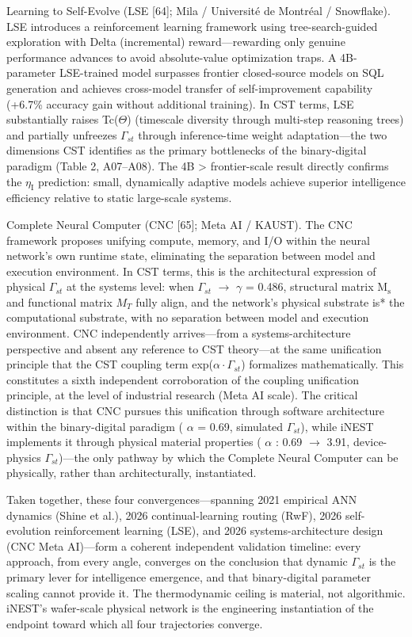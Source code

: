 \documentclass[a4paper,12pt]{article}
\providecommand{\textsubscript}[1]{\ensuremath{_{\text{#1}}}}
\begin{document}
Learning to Self-Evolve (LSE [64]; Mila / Universit\'e de Montr\'eal / Snowflake).
LSE introduces a reinforcement learning framework using tree-search-guided exploration with Delta (incremental) reward---rewarding only genuine performance advances to avoid absolute-value optimization traps.
A 4B-parameter LSE-trained model surpasses frontier closed-source models on SQL generation and achieves cross-model transfer of self-improvement capability (+6.7\% accuracy gain without additional training).
In CST terms, LSE substantially raises Tc($\Theta$) (timescale diversity through multi-step reasoning trees) and partially unfreezes $\Gamma_{st}$ through inference-time weight adaptation---the two dimensions CST identifies as the primary bottlenecks of the binary-digital paradigm (Table 2, A07--A08).
The 4B > frontier-scale result directly confirms the $\eta_{\text{I}}$ prediction: small, dynamically adaptive models achieve superior intelligence efficiency relative to static large-scale systems.

Complete Neural Computer (CNC [65]; Meta AI / KAUST).
The CNC framework proposes unifying compute, memory, and I/O within the neural network's own runtime state, eliminating the separation between model and execution environment.
In CST terms, this is the architectural expression of physical $\Gamma_{st}$ at the systems level: when $\Gamma_{st}$  $\rightarrow$   $\gamma$  = 0.486, structural matrix M\textsubscript{s} and functional matrix $M_{T}$ fully align, and the network's physical substrate is* the computational substrate, with no separation between model and execution environment.
CNC independently arrives---from a systems-architecture perspective and absent any reference to CST theory---at the same unification principle that the CST coupling term exp($\alpha \cdot \Gamma_{st}$) formalizes mathematically.
This constitutes a sixth independent corroboration of the coupling unification principle, at the level of industrial research (Meta AI scale).
The critical distinction is that CNC pursues this unification through software architecture within the binary-digital paradigm ( $\alpha$  = 0.69, simulated $\Gamma_{st}$), while iNEST implements it through physical material properties ( $\alpha$ : 0.69 $\rightarrow$ 3.91, device-physics $\Gamma_{st}$)---the only pathway by which the Complete Neural Computer can be physically, rather than architecturally, instantiated.

Taken together, these four convergences---spanning 2021 empirical ANN dynamics (Shine et al.), 2026 continual-learning routing (RwF), 2026 self-evolution reinforcement learning (LSE), and 2026 systems-architecture design (CNC Meta AI)---form a coherent independent validation timeline: every approach, from every angle, converges on the conclusion that dynamic $\Gamma_{st}$ is the primary lever for intelligence emergence, and that binary-digital parameter scaling cannot provide it.
The thermodynamic ceiling is material, not algorithmic. iNEST's wafer-scale physical network is the engineering instantiation of the endpoint toward which all four trajectories converge.
\end{document}
